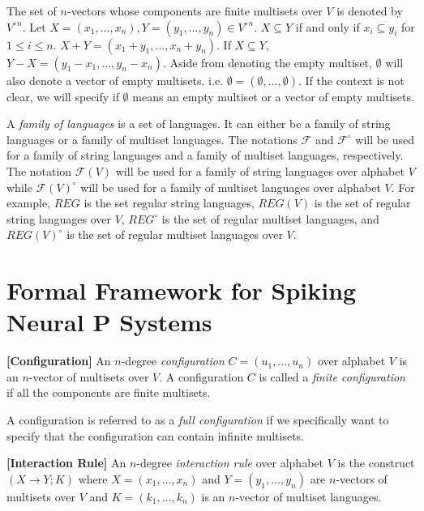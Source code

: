 \documentclass[a4paper]{article}
\theoremstyle{definition}
\newcommand{\ra}{\rightarrow}
\begin{document}
The set of $n$-vectors whose components are finite multisets over $V$ is denoted by
${V^{\circ}}^{n}$. Let $X=(x_1,...,x_n), Y=(y_1,...,y_n) \in {V^{\circ}}^n$. $X \subseteq Y$ if and
only if $x_i \subseteq y_i$ for $1 \leq i \leq n$. $X+Y = (x_1 + y_1,...,x_n + y_n)$. If 
$X \subseteq Y$, $Y-X = (y_1-x_1,...,y_n-x_n)$. Aside from denoting the empty multiset, $\emptyset$
will also denote a vector of empty multisets. i.e. $\emptyset = (\emptyset,...,\emptyset)$. If the
context is not clear, we will specify if $\emptyset$ means an empty multiset or a vector of empty
multisets.  

A \emph{family of languages} is a set of languages. It can either be a family of string languages or 
a family of multiset languages. The notations $\mathscr{F}$ and $\mathscr{F}^{\circ}$ will be used
for a family of string languages and a family of multiset languages, respectively. The notation
$\mathscr{F}(V)$ will be used for a family of string languages over alphabet $V$ while 
$\mathscr{F}(V)^{\circ}$ will be used for a family of multiset languages over alphabet $V$. For
example, $REG$ is the set regular string languages, $REG(V)$ is the set of regular string 
languages over $V$, $REG^{\circ}$ is the set of regular multiset languages, and $REG(V)^{\circ}$ 
is the set of regular multiset languages over $V$.


\section{Formal Framework for Spiking Neural P Systems}


\label{def-conf} \textbf{[Configuration]} An $n$-degree \emph{configuration} 
$C = (u_1,...,u_n)$ over alphabet $V$ is an $n$-vector of multisets over $V$. A configuration $C$ is 
called a \emph{finite configuration} if all the components are finite multisets. 

A configuration is referred to as a \emph{full configuration} if we specifically want to specify 
that the configuration can contain infinite multisets.


\label{def-rule} \textbf{[Interaction Rule]} An $n$-degree \emph{interaction rule} over
alphabet $V$ is the construct $(X \ra Y; K)$ where $X=(x_1,...,x_n)$ and $Y=(y_1,...,y_n)$ 
are $n$-vectors of multisets over $V$ and $K = (k_1,...,k_n)$ is an $n$-vector of multiset
languages.
\end{document}
